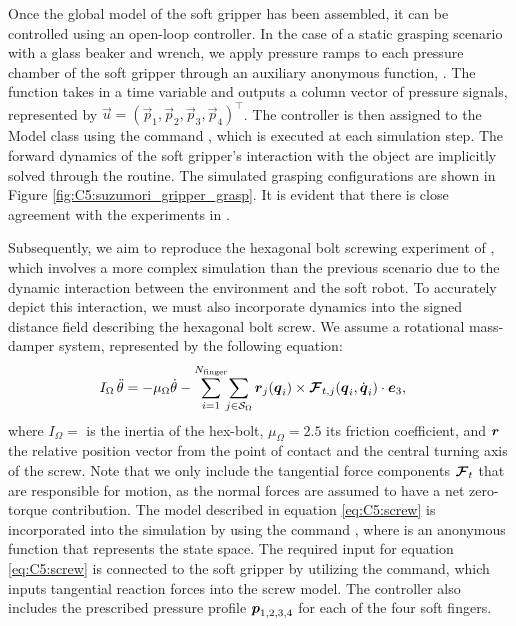 Once the global model of the soft gripper has been assembled, it can be controlled using an open-loop controller. In the case of a static grasping scenario with a glass beaker and wrench, we apply pressure ramps to each pressure chamber of the soft gripper through an auxiliary anonymous function, . The function takes in a time variable and outputs a column vector of pressure signals, represented by $\vec{u} = (\vec{p}_1, \vec{p}_2, \vec{p}_3, \vec{p}_4)^\top$. The controller is then assigned to the Model class using the command , which is executed at each simulation step. The forward dynamics of the soft gripper's interaction with the object are implicitly solved through the  routine. The simulated grasping configurations are shown in Figure \ref{fig:C5:suzumori_gripper_grasp}. It is evident that there is close agreement with the experiments in \cite{Suzumori1991,Suzumori1992}.

Subsequently, we aim to reproduce the hexagonal bolt screwing experiment of \cite{Suzumori1992,Suzumori1991}, which involves a more complex simulation than the previous scenario due to the dynamic interaction between the environment and the soft robot. To accurately depict this interaction, we must also incorporate dynamics into the signed distance field describing the hexagonal bolt screw. We assume a rotational mass-damper system, represented by the following equation:
%
\begin{align}
    I_\Omega\,\ddot{\theta} & = -\mu_\Omega \dot{\theta} -\sum_{i=1}^{N_{\textrm{finger}}} \!\!\sum_{j \in \mathcal{S}_\Omega} {\boldsymbol{r}}_j ({\boldsymbol{q}}_i) \times {\boldsymbol{\mathcal{F}}}_{t,j}({\boldsymbol{q}}_i,\dot{{\boldsymbol{q}}}_i) \cdot \boldsymbol{e}_3,                                                                      
    \label{eq:C5:screw}
\end{align}
%
where $I_\Omega = $ is the inertia of the hex-bolt, $\mu_\Omega = 2.5$ its friction coefficient, and ${\boldsymbol{r}}$ the relative position vector from the point of contact and the central turning axis of the screw. Note that we only include the tangential force components ${\boldsymbol{\mathcal{F}}}_t$ that are responsible for motion, as the normal forces are assumed to have a net zero-torque contribution. The model described in equation \eqref{eq:C5:screw} is incorporated into the simulation by using the command , where  is an anonymous function that represents the state space. The required input  for equation \eqref{eq:C5:screw} is connected to the soft gripper by utilizing the  command, which inputs tangential reaction forces into the screw model. The controller also includes the prescribed pressure profile ${\boldsymbol{p}}_{1,2,3,4}$ for each of the four soft fingers.\\
%

